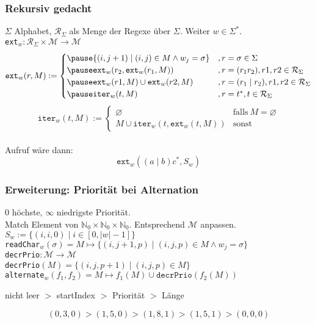 \documentclass{beamer}
\begin{document}
    \begin{frame}[t]
        \frametitle{Rekursiv gedacht}
        {\small
            $\Sigma$ Alphabet, $\mathcal{R}_\Sigma$ als Menge der Regexe über $\Sigma$. Weiter $w \in \Sigma^*$.} \\[5pt]
        {\small
            \texttt{ext}$_w : \mathcal{R}_\Sigma \times \mathcal{M} \to \mathcal{M}$
            $$
                \texttt{ext}_w(r, M) := \begin{cases}
                    \pause\{(i, j+1) \mid (i,j) \in M \land w_j = \sigma\}
                        &, r = \sigma \in \Sigma\\
                    \pause\texttt{ext}_w(r_2, \texttt{ext}_w(r_1, M))
                        &, r = (r_1r_2), r1,r2 \in \mathcal{R}_\Sigma\\
                    \pause\texttt{ext}_w(r1, M) \cup \texttt{ext}_w(r2,M)
                        &, r = (r_1 \mid r_2),r1,r2 \in \mathcal{R}_\Sigma\\
                    \pause\texttt{iter}_w(t, M)
                        &, r = t^*,t \in \mathcal{R}_\Sigma
                \end{cases}
            $$$$
            \texttt{iter}_w(t, M) := \begin{cases}
                    \varnothing & \text{falls}\ M = \varnothing\\
                    M \cup \texttt{iter}_w(t, \texttt{ext}_w(t, M)) & \text{sonst}
                \end{cases}
            $$\\[5pt]
            \pause
            Aufruf wäre dann:
            $$
                \texttt{ext}_w((a\mid b)c^*, S_w)
            $$
        }
    \end{frame}

    \begin{frame}[t]
        \frametitle{Erweiterung: Priorität bei Alternation}
        0 höchste, $\infty$ niedrigste Priorität.\\[10pt]
        Match Element von $\mathbb{N}_0 \times \mathbb{N}_0 \times \mathbb{N}_0$.
        Entsprechend $\mathcal{M}$ anpassen.\\[5pt]
        $S_w := \{(i,i,0) \mid i \in [0, |w|-1]\}$\\[10pt]
        \pause
        \texttt{readChar}$_w(\sigma) = M \mapsto \{(i, j+1, p) \mid (i,j,p) \in M \land w_j = \sigma\}$\\[10pt]
        \pause
        \texttt{decrPrio}$ : \mathcal{M} \to \mathcal{M}$\\
        \texttt{decrPrio}$(M) = \{(i,j,p+1) \mid (i,j,p) \in M\}$\\[10pt]
        \pause
        \texttt{alternate}$_w(f_1,f_2) = M \mapsto f_1(M) \cup \texttt{decrPrio}(f_2(M))$\\[10pt]
        \pause
        \begin{center}
            nicht leer $>$ startIndex $>$ Priorität $>$ Länge
        \end{center}
        $$
            (0,3,0) > (1,5,0) > (1,8,1) > (1,5,1) > (0,0,0)
        $$
    \end{frame}
\end{document}
